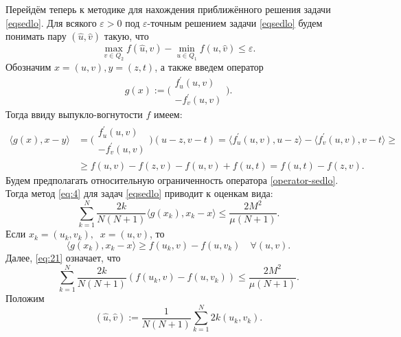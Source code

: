    Перейдём теперь к методике для нахождения приближённого решения задачи \eqref{eqsedlo}. Для всякого $\varepsilon > 0$ под $\varepsilon$-точным решением задачи \eqref{eqsedlo} будем понимать пару $(\widehat{u}, \widehat{v})$ такую, что $$\max_{v \in Q_2} f(\widehat{u}, v) - \min_{u \in Q_1} f(u, \widehat{v}) \leq \varepsilon.$$ Обозначим $x = (u, v), y = (z, t)$, а также введем оператор 
    \begin{equation}\label{operator-sedlo}
        g(x) := \Bigg( 
        \begin{aligned}
            f^{'}_{u}(u,v)\\
            -f^{'}_{v}(u,v)
        \end{aligned}
        \Bigg).
    \end{equation}
    Тогда ввиду выпукло-вогнутости $f$ имеем: 
    \begin{equation}
    \begin{aligned}
        \langle g(x), x - y \rangle &=
         \Bigg( 
        \begin{aligned}
            f^{'}_{u}(u,v)\\
            -f^{'}_{v}(u,v)
        \end{aligned}
        \Bigg)
         (u - z, v - t)  = \langle f^{'}_{u}(u,v), u - z \rangle - \langle f^{'}_{v}(u,v), v - t \rangle \geq \\&
         \geq f(u, v) - f(z, v) 
        - f(u, v)+ f(u, t)=  f(u,t) - f(z, v).
    \end{aligned}
    \end{equation}
    Будем предполагать относительную ограниченность оператора \eqref{operator-sedlo}. Тогда метод \eqref{eq:4} для задач \eqref{eqsedlo} приводит к оценкам вида:
    \begin{equation} \label{eq:21}
        \sum_{k=1}^{N} \frac{2k}{N(N+1)} \langle g(x_k), x_k -x\rangle \leq \frac{2 M^2}{\mu (N+1)}.
    \end{equation}
    Если $x_k = (u_k, v_k), \;\; x = (u, v)$, то  
    \begin{equation}
        \langle g(x_k), x_k -x\rangle \geq f(u_k,v) - f(u, v_k) \quad \forall (u, v).
    \end{equation}
    Далее, \eqref{eq:21} означает, что 
    \begin{equation}
        \sum_{k=1}^{N} \frac{2k}{N(N+1)} (f(u_k,v) - f(u, v_k)) \leq \frac{2M^2}{\mu (N+1)}.
    \end{equation}
    Положим
    \begin{equation}
        (\widehat{u}, \widehat{v}) := \frac{1}{N(N+1)} \sum_{k=1}^{N} 2k (u_k,v_k).
    \end{equation}
